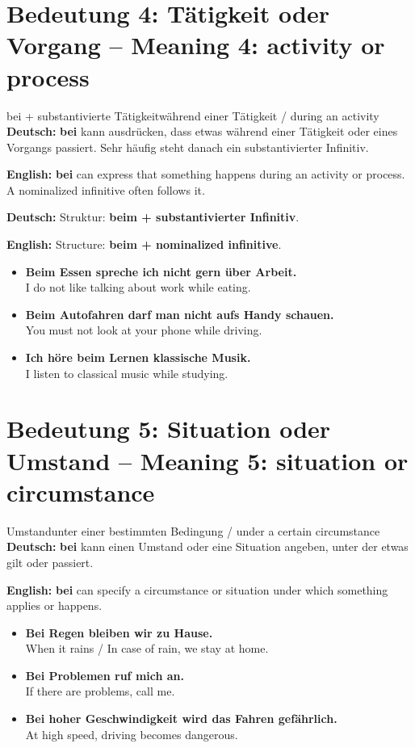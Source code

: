 \documentclass[a4paper,11pt]{article}
\newcommand{\GermanText}[1]{\textbf{Deutsch: }#1\par}
\newcommand{\EnglishText}[1]{{\small\color{SoftGray}\textbf{English: }#1\par}}
\newcommand{\ExampleItem}[2]{\item \textbf{#1}\\{\small\color{SoftGray}#2}}
\begin{document}
   \section{Bedeutung 4: Tätigkeit oder Vorgang -- Meaning 4: activity or process}
                  \begin{grammarentry}{bei + substantivierte Tätigkeit}{während einer Tätigkeit / during an activity}
                     \GermanText{\textbf{bei} kann ausdrücken, dass etwas während einer Tätigkeit oder eines Vorgangs passiert. Sehr häufig steht danach ein substantivierter Infinitiv.}
                     \EnglishText{\textbf{bei} can express that something happens during an activity or process. A nominalized infinitive often follows it.}
                     \GermanText{Struktur: \textbf{beim + substantivierter Infinitiv}.}
                     \EnglishText{Structure: \textbf{beim + nominalized infinitive}.}
                  \end{grammarentry}
                  \begin{exbox}\begin{itemize}
                     \ExampleItem{Beim Essen spreche ich nicht gern über Arbeit.}{I do not like talking about work while eating.}
                     \ExampleItem{Beim Autofahren darf man nicht aufs Handy schauen.}{You must not look at your phone while driving.}
                     \ExampleItem{Ich höre beim Lernen klassische Musik.}{I listen to classical music while studying.}
                     \end{itemize}\end{exbox}

   \section{Bedeutung 5: Situation oder Umstand -- Meaning 5: situation or circumstance}
                     \begin{grammarentry}{Umstand}{unter einer bestimmten Bedingung / under a certain circumstance}
                        \GermanText{\textbf{bei} kann einen Umstand oder eine Situation angeben, unter der etwas gilt oder passiert.}
                        \EnglishText{\textbf{bei} can specify a circumstance or situation under which something applies or happens.}
                     \end{grammarentry}
                     \begin{exbox}\begin{itemize}
                        \ExampleItem{Bei Regen bleiben wir zu Hause.}{When it rains / In case of rain, we stay at home.}
                        \ExampleItem{Bei Problemen ruf mich an.}{If there are problems, call me.}
                        \ExampleItem{Bei hoher Geschwindigkeit wird das Fahren gefährlich.}{At high speed, driving becomes dangerous.}
                        \end{itemize}\end{exbox}
\end{document}

